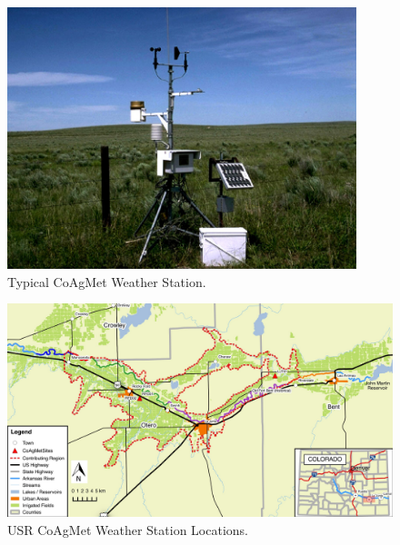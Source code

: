 \begin{figure}[htbp]
\centering
	\includegraphics[width=4in]{Figures/Photo/CoagmetStation}
	\caption[Typical CoAgMet Weather Station.]{Typical CoAgMet Weather Station.}
	\label{pic:CoAgMetStation}
\end{figure}


	\begin{landscape}
	\begin{figure}[htbp]
		\includegraphics[scale=1]{Figures/Map/USRCoAgMet}
		\caption[USR CoAgMet Weather Station Locations.]{USR CoAgMet Weather Station Locations.}
		\label{map:USRCoAgMetLocations}	
	\end{figure}
	\end{landscape}

